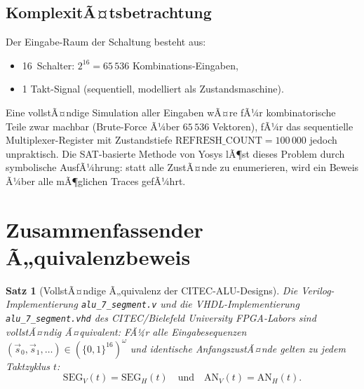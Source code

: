 ﻿\documentclass[12pt,a4paper]{report}
\newtheorem{theorem}{Satz}[section]
\begin{document}
\subsection{KomplexitÃ¤tsbetrachtung}

Der Eingabe-Raum der Schaltung besteht aus:
\begin{itemize}
	\item 16~Schalter: $2^{16} = 65\,536$ Kombinations-Eingaben,
	\item 1 Takt-Signal (sequentiell, modelliert als Zustandsmaschine).
\end{itemize}

Eine vollstÃ¤ndige Simulation aller Eingaben wÃ¤re fÃ¼r kombinatorische Teile
zwar machbar (Brute-Force Ã¼ber $65\,536$ Vektoren), fÃ¼r das sequentielle
Multiplexer-Register mit Zustandstiefe
$\text{REFRESH\_COUNT} = 100\,000$ jedoch unpraktisch.  Die
SAT-basierte Methode von Yosys lÃ¶st dieses Problem durch symbolische
AusfÃ¼hrung: statt alle ZustÃ¤nde zu enumerieren, wird ein Beweis Ã¼ber alle
mÃ¶glichen Traces gefÃ¼hrt.

\section{Zusammenfassender Ã„quivalenzbeweis}
\label{subsec:hauptsatz}

\begin{theorem}[VollstÃ¤ndige Ã„quivalenz der CITEC-ALU-Designs]
	\label{thm:hauptsatz_vv}
	Die Verilog-Implemen\-tierung \texttt{alu\_7\_segment.v} und die
	VHDL-Implementierung \texttt{alu\_7\_segment.vhd} des CITEC/Bielefeld
	University FPGA-Labors sind vollstÃ¤ndig Ã¤quivalent: FÃ¼r alle
	Eingabesequenzen $(\vec{s}_0, \vec{s}_1, \ldots) \in (\{0,1\}^{16})^\omega$
	und identische AnfangszustÃ¤nde gelten zu jedem Taktzyklus $t$:
	\[
	\mathrm{SEG}_V(t) = \mathrm{SEG}_H(t)
	\quad\text{und}\quad
	\mathrm{AN}_V(t) = \mathrm{AN}_H(t).
	\]
\end{theorem}
\end{document}
